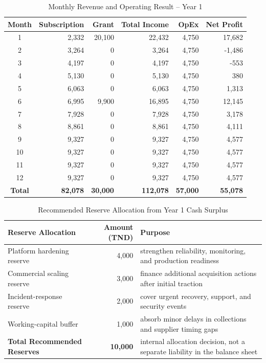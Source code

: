 \documentclass[12pt,a4paper,oneside]{report}
\begin{document}
\begin{table}[!htbp]
\centering
\small
\begin{tabular}{|c|r|r|r|r|r|}
\hline
\rowcolor{gray!20}
\textbf{Month} & \textbf{Subscription} & \textbf{Grant} & \textbf{Total Income} & \textbf{OpEx} & \textbf{Net Profit} \\
\hline
1 & 2{,}332 & 20{,}100 & 22{,}432 & 4{,}750 & 17{,}682 \\
\hline
2 & 3{,}264 & 0 & 3{,}264 & 4{,}750 & -1{,}486 \\
\hline
3 & 4{,}197 & 0 & 4{,}197 & 4{,}750 & -553 \\
\hline
4 & 5{,}130 & 0 & 5{,}130 & 4{,}750 & 380 \\
\hline
5 & 6{,}063 & 0 & 6{,}063 & 4{,}750 & 1{,}313 \\
\hline
6 & 6{,}995 & 9{,}900 & 16{,}895 & 4{,}750 & 12{,}145 \\
\hline
7 & 7{,}928 & 0 & 7{,}928 & 4{,}750 & 3{,}178 \\
\hline
8 & 8{,}861 & 0 & 8{,}861 & 4{,}750 & 4{,}111 \\
\hline
9 & 9{,}327 & 0 & 9{,}327 & 4{,}750 & 4{,}577 \\
\hline
10 & 9{,}327 & 0 & 9{,}327 & 4{,}750 & 4{,}577 \\
\hline
11 & 9{,}327 & 0 & 9{,}327 & 4{,}750 & 4{,}577 \\
\hline
12 & 9{,}327 & 0 & 9{,}327 & 4{,}750 & 4{,}577 \\
\hline
\rowcolor{gray!20}
\textbf{Total} & \textbf{82{,}078} & \textbf{30{,}000} & \textbf{112{,}078} & \textbf{57{,}000} & \textbf{55{,}078} \\
\hline
\end{tabular}
\caption{Monthly Revenue and Operating Result -- Year 1}
\label{tab:vigileeye_monthly_appendix}
\end{table}

\begin{table}[!htbp]
\centering
\small
\begin{tabular}{|p{5.2cm}|r|p{5.2cm}|}
\hline
\rowcolor{gray!20}
\textbf{Reserve Allocation} & \textbf{Amount (TND)} & \textbf{Purpose} \\
\hline
Platform hardening reserve & 4{,}000 & strengthen reliability, monitoring, and production readiness \\
\hline
Commercial scaling reserve & 3{,}000 & finance additional acquisition actions after initial traction \\
\hline
Incident-response reserve & 2{,}000 & cover urgent recovery, support, and security events \\
\hline
Working-capital buffer & 1{,}000 & absorb minor delays in collections and supplier timing gaps \\
\hline
\rowcolor{gray!20}
\textbf{Total Recommended Reserves} & \textbf{10{,}000} & internal allocation decision, not a separate liability in the balance sheet \\
\hline
\end{tabular}
\caption{Recommended Reserve Allocation from Year 1 Cash Surplus}
\label{tab:vigileeye_reserves_appendix}
\end{table}
\end{document}
